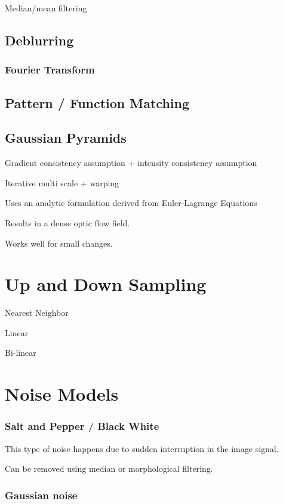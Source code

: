 Median/mean filtering

\subsection{Deblurring}

\subsubsection{Fourier Transform}

\subsection{Pattern / Function Matching }

\subsection{Gaussian Pyramids}



Gradient consistency assumption + intensity consistency assumption

Iterative multi scale + warping

Uses an analytic formulation derived from Euler-Lagrange Equations

Results in a dense optic flow field.

Works well for small changes.

\section{Up and Down Sampling}


Nearest Neighbor

Linear

Bi-linear

\section{Noise Models}

\subsubsection{Salt and Pepper / Black White}

This type of noise happens due to sudden interruption in the image signal.

Can be removed using median or morphological filtering.

\subsubsection{Gaussian noise}


